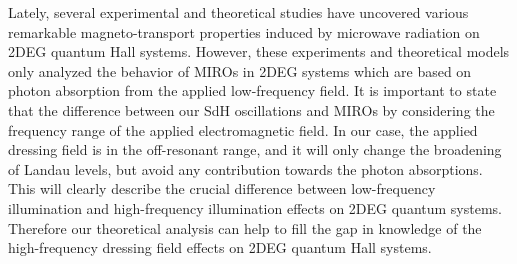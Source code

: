 \documentclass[
 reprint,
 amsmath,amssymb,
 aps,
 prb,
]{revtex4-2}
\begin{document}
{\color{Red}
Lately, several experimental \cite{zudov01,mani02,zudov03,mani04} and theoretical \cite{durst03,dmitriev03,dmitriev05,dmitriev09} studies have uncovered various remarkable
magneto-transport properties induced by microwave radiation on 2DEG quantum Hall systems. However, these experiments and theoretical models only analyzed the behavior of MIROs in 2DEG systems which are based on photon absorption from the applied low-frequency field.
It is important to state that the difference between our SdH oscillations and MIROs \cite{zudov01,mani02,zudov03,mani04} by considering the frequency range of the applied electromagnetic field. In our case, the applied dressing field is in the off-resonant range, and it will only change the broadening of Landau levels, but avoid any contribution towards the photon absorptions. This will clearly describe the crucial difference between low-frequency illumination and high-frequency illumination effects on 2DEG quantum systems. Therefore our theoretical analysis can help to fill the gap in knowledge of the high-frequency dressing field effects on 2DEG quantum Hall systems.
}
\end{document}
